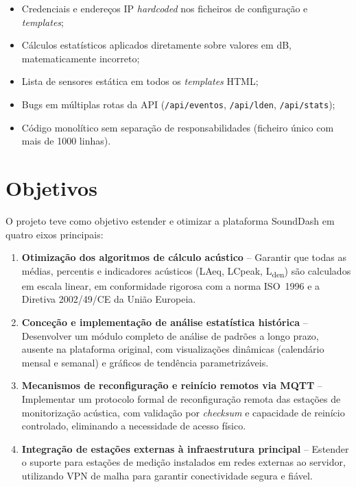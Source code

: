 \documentclass[12pt,a4paper]{report}
\begin{document}
\begin{itemize}[nosep]
  \item Credenciais e endereços IP \textit{hardcoded} nos ficheiros de configuração e \textit{templates};
  \item Cálculos estatísticos aplicados diretamente sobre valores em dB, matematicamente incorreto;
  \item Lista de sensores estática em todos os \textit{templates} HTML;
  \item Bugs em múltiplas rotas da API (\texttt{/api/eventos}, \texttt{/api/lden}, \texttt{/api/stats});
  \item Código monolítico sem separação de responsabilidades (ficheiro único com mais de 1000 linhas).
\end{itemize}

\section{Objetivos}

O projeto teve como objetivo estender e otimizar a plataforma SoundDash em quatro eixos principais:

\begin{enumerate}[leftmargin=*, label=\textbf{\arabic*.}]
  \item \textbf{Otimização dos algoritmos de cálculo acústico} -- Garantir que todas as médias, percentis e indicadores acústicos (LAeq, LCpeak, L\textsubscript{den}) são calculados em escala linear, em conformidade rigorosa com a norma ISO~1996 e a Diretiva 2002/49/CE da União Europeia.

  \item \textbf{Conceção e implementação de análise estatística histórica} -- Desenvolver um módulo completo de análise de padrões a longo prazo, ausente na plataforma original, com visualizações dinâmicas (calendário mensal e semanal) e gráficos de tendência parametrizáveis.

  \item \textbf{Mecanismos de reconfiguração e reinício remotos via MQTT} -- Implementar um protocolo formal de reconfiguração remota das estações de monitorização acústica, com validação por \textit{checksum} e capacidade de reinício controlado, eliminando a necessidade de acesso físico.

  \item \textbf{Integração de estações externas à infraestrutura principal} -- Estender o suporte para estações de medição instalados em redes externas ao servidor, utilizando VPN de malha para garantir conectividade segura e fiável.
\end{enumerate}
\end{document}
